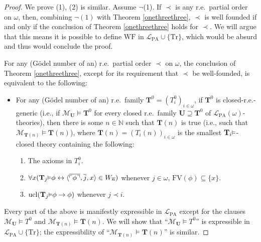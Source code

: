 \documentclass[reqno]{article}
\theoremstyle{definition}
\def\L{\mathscr{L}}
\def\M{\mathscr{M}}
\def\T{\mathbf{T}}
\def\U{\mathbf{U}}
\def\FV{\mathrm{FV}}
\def\LPA{\L_{\mathrm{PA}}}
\def\Tr{\mathrm{Tr}}
\renewcommand{\Pr}[1]{\T_{#1}\mbox{\small${\vDash}$}}
\newcommand{\ucl}[1]{\mathrm{ucl}(#1)}
\begin{document}
\begin{proof}
We prove (1), (2) is similar.
Assume $\neg$(1).  If $\prec$ is any r.e.~partial order on $\omega$,
then, combining $\neg(1)$ with Theorem \ref{onethreethree},
$\prec$ is well founded if and only if the conclusion of Theorem \ref{onethreethree} holds for $\prec$.
We will argue that this means it is possible to define $\mathrm{WF}$ in
$\LPA\cup\{\Tr\}$, which would be absurd and thus would conclude the proof.

For any (G\"odel number of an) r.e.\ partial order $\prec$
on $\omega$, the conclusion of Theorem \ref{onethreethree}, except for its requirement
that $\prec$ be well-founded, is equivalent to the following:
\begin{itemize}
    \item
    For any (G\"odel number of an) r.e.\ family $\T^0=(T^0_i)_{i\in\omega}$,
    if $\T^0$ is closed-r.e.-generic
    (i.e., if $\M_\U\models\T^0$ for every closed r.e.\ family $\U\supseteq\T^0$
    of $\LPA(\omega)$-theories), then there is some $n\in\mathbb N$
    such that $\T(n)$ is true
    (i.e., such that $\M_{\T(n)}\models\T(n)$), where
    $\T(n)=(T_i(n))_{i\in\omega}$ is the smallest
    $\Pr i$-closed theory containing the following:
    \begin{enumerate}
        \item
        The axioms in $T^0_i$.
        \item
        $\forall x (\Pr j \phi \leftrightarrow \langle \overline{\ulcorner \phi\urcorner},
        \overline j, x\rangle\in W_{\overline n})$ whenever $j\in\omega$,
        $\FV(\phi)\subseteq\{x\}$.
        \item
        $\ucl{\Pr j \phi\rightarrow\phi}$ whenever $j\prec i$.
    \end{enumerate}
\end{itemize}
Every part of the above is manifestly expressible in $\LPA$ except for the clauses
$\M_\U\models T^0$ and $\M_{\T(n)}\models \T(n)$.
We will show that ``$\M_\U\models T^0$'' is expressible in $\LPA\cup\{\Tr\}$;
the expressibility of ``$\M_{\T(n)}\models \T(n)$'' is similar.


\end{proof}
\end{document}
